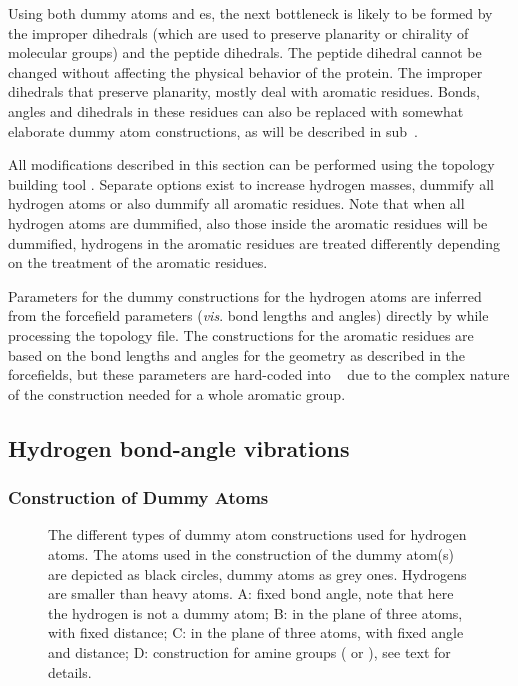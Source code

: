 Using both dummy atoms and es, the next
bottleneck is likely to be formed by the improper dihedrals (which are
used to preserve planarity or chirality of molecular groups) and the
peptide dihedrals. The peptide dihedral cannot be changed without
affecting the physical behavior of the protein. The improper dihedrals
that preserve planarity, mostly deal with aromatic residues. Bonds,
angles and dihedrals in these residues can also be replaced with
somewhat elaborate dummy atom constructions, as will be described in
sub~.

All modifications described in this section can be performed using the
{\gromacs} topology building tool {\tt {}}. Separate
options exist to increase hydrogen masses, dummify all hydrogen atoms
or also dummify all aromatic residues. Note that when all hydrogen
atoms are dummified, also those inside the aromatic residues will be
dummified, {\ie} hydrogens in the aromatic residues are treated
differently depending on the treatment of the aromatic residues.

Parameters for the dummy constructions for the hydrogen atoms are
inferred from the forcefield parameters ({\em vis}. bond lengths and
angles) directly by {\tt {}} while processing the
topology file.  The constructions for the aromatic residues are based
on the bond lengths and angles for the geometry as described in the
forcefields, but these parameters are hard-coded into {\tt
{}} due to the complex nature of the construction
needed for a whole aromatic group.

\subsection{Hydrogen bond-angle vibrations}
\label{sec:dummyhydro}
\subsubsection{Construction of Dummy Atoms} %
\begin{figure}
\centerline{}
\caption[Dummy atom constructions for hydrogen atoms.]{The different
types of dummy atom constructions used for hydrogen atoms. The atoms
used in the construction of the dummy atom(s) are depicted as black
circles, dummy atoms as grey ones. Hydrogens are smaller than heavy
atoms. {\sf A}: fixed bond angle, note that here the hydrogen is not a
dummy atom; {\sf B}: in the plane of three atoms, with fixed distance;
{\sf C}: in the plane of three atoms, with fixed angle and distance;
{\sf D}: construction for amine groups ({\amine} or {\aminep}), see
text for details.}
\label{fig:dumhydro}
\end{figure}

